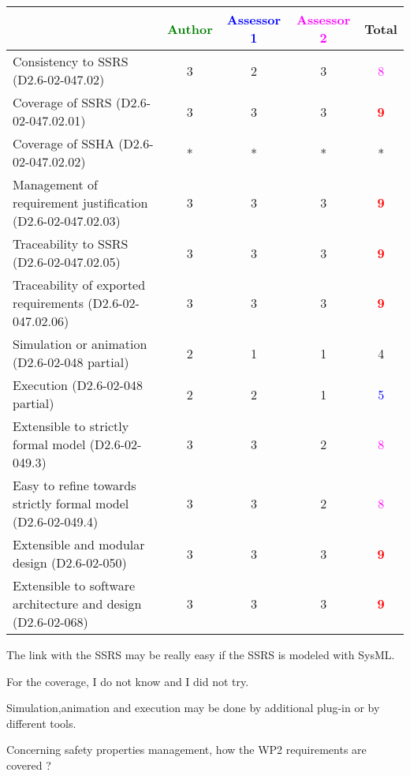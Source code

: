 \begin{tabular}{|l | c | c | c | c|}
\hline
& \textcolor{green}{Author} & \textcolor{blue}{Assessor 1} & \textcolor{magenta}{Assessor 2} & Total \\
\hline 
Consistency to SSRS (D2.6-02-047.02) &3 &2 & 3   & \textcolor{magenta}{8} \\
\hline
Coverage of SSRS (D2.6-02-047.02.01)  &3 & 3   & 3   & \textcolor{red}{\textbf{9}} \\
\hline
Coverage of SSHA (D2.6-02-047.02.02)  & * & *& *& * \\
\hline
Management of requirement justification (D2.6-02-047.02.03)  &3 & 3   & 3   & \textcolor{red}{\textbf{9}} \\
\hline
Traceability to  SSRS (D2.6-02-047.02.05)  & 3    & 3   & 3   & \textcolor{red}{\textbf{9}} \\
\hline
Traceability of exported requirements (D2.6-02-047.02.06)  &3 & 3   & 3   & \textcolor{red}{\textbf{9}} \\
\hline
Simulation or animation (D2.6-02-048 partial)  &2 & 1   & 1   & 4     \\
\hline
Execution (D2.6-02-048 partial)  &2 & 2   & 1   & \textcolor{blue}{5} \\
\hline
Extensible to strictly formal model (D2.6-02-049.3) &3 & 3   & 2   & \textcolor{magenta}{8} \\
\hline
Easy to  refine towards strictly formal model (D2.6-02-049.4) &3 & 3   & 2   & \textcolor{magenta}{8} \\
\hline
Extensible and modular design (D2.6-02-050)  &3 & 3   & 3   & \textcolor{red}{\textbf{9}} \\
\hline
Extensible to software architecture and design (D2.6-02-068)   &3 & 3   & 3   & \textcolor{red}{\textbf{9}} \\
\hline
\end{tabular}
\begin{author_comment}
The link with the SSRS may be really easy if the SSRS is modeled
with SysML.

For the coverage, I do not know and I did not try.


Simulation,animation  and execution may be done by additional plug-in
or by different tools.
\end{author_comment}
Concerning safety properties management, how the WP2 requirements are covered ?

